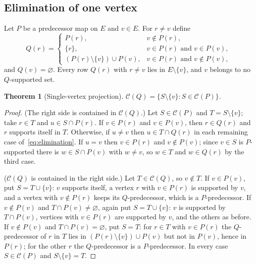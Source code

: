 \documentclass[11pt,a4paper]{article}
\theoremstyle{plain}
\newtheorem{theorem}{Theorem}[section]
\theoremstyle{definition}
\theoremstyle{remark}
\newcommand{\cC}{\mathcal C}
\begin{document}
\subsection{Elimination of one vertex}

Let $P$ be a predecessor map on $E$ and $v\in E$. For $r\neq v$ define
\begin{equation}\label{eq:elimination}
 Q(r)=
 \begin{cases}
 P(r), & v\notin P(r),\\
 \{r\}, & v\in P(r)\text{ and } v\in P(v),\\
 (P(r)\setminus\{v\})\cup P(v), & v\in P(r)\text{ and } v\notin P(v),
 \end{cases}
\end{equation}
and $Q(v)=\varnothing$. Every row $Q(r)$ with $r\neq v$ lies in $E\setminus\{v\}$, and $v$ belongs to no $Q$-supported set.

\begin{theorem}[Single-vertex projection]\label{thm:elimination}
$\cC(Q)=\{S\setminus\{v\}: S\in\cC(P)\}$.
\end{theorem}

\begin{proof}
(The right side is contained in $\cC(Q)$.) Let $S\in\cC(P)$ and $T=S\setminus\{v\}$; take $r\in T$ and $u\in S\cap P(r)$. If $v\in P(r)$ and $v\in P(v)$, then $r\in Q(r)$ and $r$ supports itself in $T$. Otherwise, if $u\neq v$ then $u\in T\cap Q(r)$ in each remaining case of~\eqref{eq:elimination}. If $u=v$ then $v\in P(r)$ and $v\notin P(v)$; since $v\in S$ is $P$-supported there is $w\in S\cap P(v)$ with $w\neq v$, so $w\in T$ and $w\in Q(r)$ by the third case.

($\cC(Q)$ is contained in the right side.) Let $T\in\cC(Q)$, so $v\notin T$. If $v\in P(v)$, put $S=T\cup\{v\}$: $v$ supports itself, a vertex $r$ with $v\in P(r)$ is supported by $v$, and a vertex with $v\notin P(r)$ keeps its $Q$-predecessor, which is a $P$-predecessor. If $v\notin P(v)$ and $T\cap P(v)\neq\varnothing$, again put $S=T\cup\{v\}$: $v$ is supported by $T\cap P(v)$, vertices with $v\in P(r)$ are supported by $v$, and the others as before. If $v\notin P(v)$ and $T\cap P(v)=\varnothing$, put $S=T$: for $r\in T$ with $v\in P(r)$ the $Q$-predecessor of $r$ in $T$ lies in $(P(r)\setminus\{v\})\cup P(v)$ but not in $P(v)$, hence in $P(r)$; for the other $r$ the $Q$-predecessor is a $P$-predecessor. In every case $S\in\cC(P)$ and $S\setminus\{v\}=T$.
\end{proof}
\end{document}
